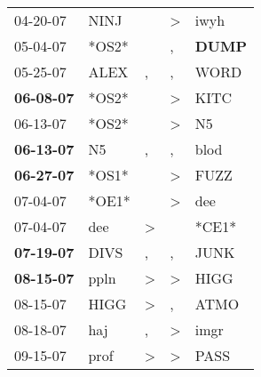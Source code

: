 \begin{supertabular}{p{0.07\textwidth}p{0.06\textwidth}p{0.02\textwidth}p{0.02\textwidth}p{0.06\textwidth}}
          04-20-07\textsuperscript{} &           NINJ\textsuperscript{} &                  &     \textgreater &           iwyh\textsuperscript{} \\
          05-04-07\textsuperscript{} &                            *OS2* &                  &                , &  \textbf{DUMP\textsuperscript{}} \\
          05-25-07\textsuperscript{} &           ALEX\textsuperscript{} &                , &                , &           WORD\textsuperscript{} \\
 \textbf{06-08-07\textsuperscript{}} &                            *OS2* &                  &     \textgreater &           KITC\textsuperscript{} \\
          06-13-07\textsuperscript{} &                            *OS2* &                  &     \textgreater &             N5\textsuperscript{} \\
 \textbf{06-13-07\textsuperscript{}} &             N5\textsuperscript{} &                , &                , &           blod\textsuperscript{} \\
 \textbf{06-27-07\textsuperscript{}} &                            *OS1* &                  &     \textgreater &           FUZZ\textsuperscript{} \\
          07-04-07\textsuperscript{} &                            *OE1* &                  &     \textgreater &            dee\textsuperscript{} \\
          07-04-07\textsuperscript{} &            dee\textsuperscript{} &     \textgreater &                  &                            *CE1* \\
 \textbf{07-19-07\textsuperscript{}} &           DIVS\textsuperscript{} &                , &                , &           JUNK\textsuperscript{} \\
 \textbf{08-15-07\textsuperscript{}} &           ppln\textsuperscript{} &     \textgreater &     \textgreater &           HIGG\textsuperscript{} \\
          08-15-07\textsuperscript{} &           HIGG\textsuperscript{} &     \textgreater &                , &           ATMO\textsuperscript{} \\
          08-18-07\textsuperscript{} &            haj\textsuperscript{} &                , &     \textgreater &           imgr\textsuperscript{} \\
          09-15-07\textsuperscript{} &           prof\textsuperscript{} &     \textgreater &     \textgreater &           PASS\textsuperscript{} \\

\end{supertabular}
